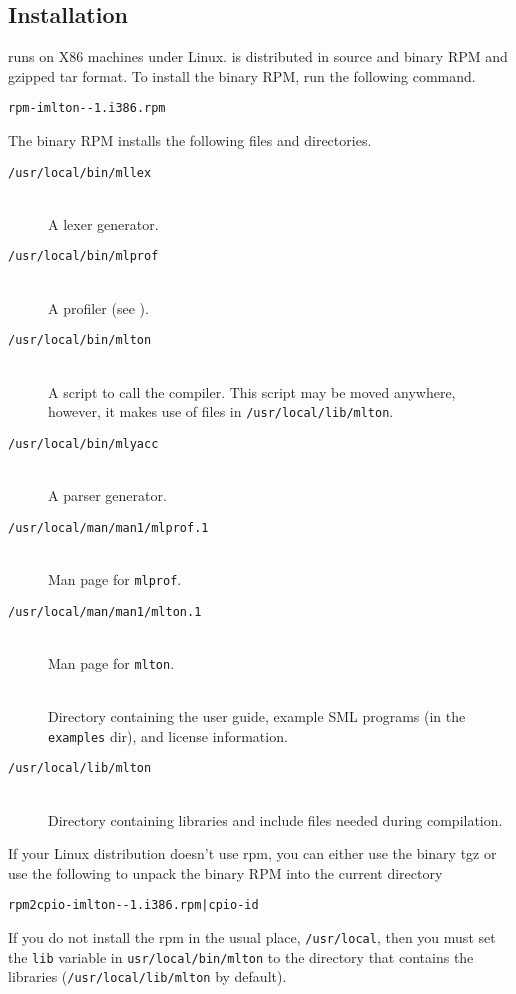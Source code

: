 
\subsection{Installation}

{\mlton} runs on X86 machines under Linux.  {\mlton} is distributed in source
and binary RPM and gzipped tar format.  To install the binary RPM, run the
following command.
\begin{alltt}
rpm -i mlton-\version-1.i386.rpm
\end{alltt}
The binary RPM installs the following files and directories.

\newcommand{\place}[1]{\item[\tt #1]\hspace{1in}\\}

\begin{description}

\place{/usr/local/bin/mllex}
A lexer generator.

\place{/usr/local/bin/mlprof}
A profiler (see ).

\place{/usr/local/bin/mlton}
A script to call the compiler.
This script may be moved anywhere, however,
it makes use of files in {\tt /usr/local/lib/mlton}.

\place{/usr/local/bin/mlyacc}
A parser generator.

\place{/usr/local/man/man1/mlprof.1}
Man page for {\tt mlprof}.

\place{/usr/local/man/man1/mlton.1}
Man page for {\tt mlton}.

\place{\doc}
Directory containing the user guide, example SML programs (in the {\tt examples}
dir), and license information.

\place{/usr/local/lib/mlton}
Directory containing libraries and include files needed during
compilation.

\end{description}

If your Linux distribution doesn't use rpm, you can either use the binary tgz or
use the following to unpack the binary RPM into the current directory
\begin{alltt}
rpm2cpio -i mlton-\version-1.i386.rpm | cpio -id
\end{alltt}
If you do not install the rpm in the usual place, {\tt /usr/local}, then you
must set the {\tt lib} variable in {\tt usr/local/bin/mlton} to the directory
that contains the libraries ({\tt /usr/local/lib/mlton} by default).

